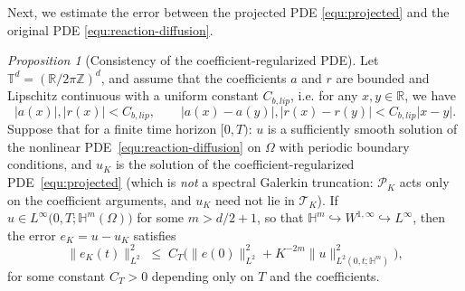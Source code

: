 \documentclass[a4paper,fleqn]{cas-sc}
\theoremstyle{definition}
\theoremstyle{remark}
\newtheorem{proposition}{Proposition}
\begin{document}
Next, we estimate the error between the projected PDE \eqref{equ:projected} and the original PDE \eqref{equ:reaction-diffusion}.
\begin{proposition}[Consistency of the coefficient-regularized PDE]
\label{prop:u_u_K}
Let $\mathbb{T}^d = (\mathbb{R}/2\pi\mathbb{Z})^d$, and assume that the coefficients $a$ and $r$ are bounded and Lipschitz continuous with a uniform constant $C_{b,lip}$, i.e. for any $x, y\in \mathbb R$, we have
    \[
    |a(x)|,|r(x)| < C_{b,lip}, \qquad |a(x)-a(y)|,|r(x)-r(y)| < C_{b,lip} |x-y|.
    \]
    Suppose that for a finite time horizon $[0,T)$: $u$ is a sufficiently smooth solution of the nonlinear PDE~\eqref{equ:reaction-diffusion} on $\Omega$ with periodic boundary conditions, and $u_K$ is the solution of the coefficient-regularized PDE~\eqref{equ:projected} (which is \emph{not} a spectral Galerkin truncation: $\mathcal P_K$ acts only on the coefficient arguments, and $u_K$ need not lie in $\mathcal T_K$).
If $u\in L^\infty\bigl(0,T;\mathbb H^m(\Omega)\bigr)$ for some $m>d/2+1$, so that $\mathbb H^m\hookrightarrow W^{1,\infty}\hookrightarrow L^\infty$, then the error $e_K=u- u_K$ satisfies
\[
\|e_K(t)\|_{L^2}^2 \;\le\; C_T\Big(\|e(0)\|_{L^2}^2 + K^{-2m}\|u\|_{L^2(0,t;\mathbb H^m)}^2\Big),
\]
for some constant $C_T>0$ depending only on $T$ and the coefficients.
\end{proposition}
\end{document}
